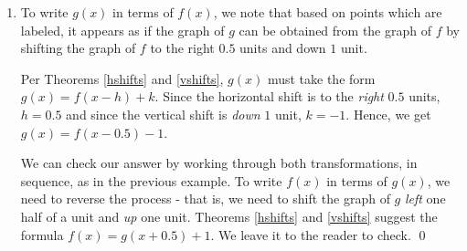 \begin{ex}
\begin{enumerate}
\begin{enumerate}
\[\begin{array}{ccc}
& 


\begin{mfpic}[15]{-4}{6}{-3}{5}
\axes
\tlabel[cc](6,-0.5){\scriptsize $x$}
\tlabel[cc](0.5,5){\scriptsize $y$}
\xmarks{-3,-2, -1, 0, 1, 2, 3, 4,5}
\ymarks{-2, -1, 0, 1, 2, 3,4}
\tcaption{\scriptsize $y = f(x+1)-2=F(x)$}
\tlpointsep{4pt}
\scriptsize
\tlabel[cc](-3.25, -2.5){$(-3,-2)$}
\tlabel[cc](-2, 1){$(1,1)$}
\tlabel[cc](1, 2.5){$(1,2)$}
\tlabel[cc](3, 0.5){$(3,2)$}
\axislabels {x}{{$1$} 1, {$2$} 2,  {$3$} 3,{$4$} 4, {$5$} 5, {\scriptsize $-1\hspace{7pt}$} -1}
\axislabels {y}{{$2$} 2,{$1$} 1,{$4$} 4,{$-1$} -1,{$-2$} -2, ,{$3$} 3}
\normalsize
\penwd{1.25pt}
\function{-3, 3, 0.1}{((x+3)*(5-x)/4)-2}
\point[4pt]{(-3,-2), (1,2), (-1,1)}
\pointfillfalse
\point[4pt]{(3,1)}
\end{mfpic}

\end{array}\]

To check, we start with the point $(-3, -2)$.  We find when we substitute $x=-3$ into the equation $y=f(x+1)-2$ we get $y = f(-3+1)-2 = f(-2)-2$.  Since $(-2,0)$ is on the graph of $f$, we know $f(-2) =0$, so  $y = f(-3+1)-2 = f(-2)-2 = 0 - 2 = -2$.  This proves $(-3,-2)$ is on the graph of $y=f(x+1)-2$.  We leave the checks of the remaining points to the reader.

\end{enumerate}

\item  To write $g(x)$ in terms of $f(x)$, we note that based on points which are labeled, it appears as if the graph of $g$ can be obtained from the graph of $f$ by shifting the graph of $f$ to the right $0.5$ units and down $1$ unit.  

\smallskip

Per Theorems \ref{hshifts} and \ref{vshifts}, $g(x)$ must take the form $g(x) = f(x-h)+k$.  Since the horizontal shift is to the \textit{right} $0.5$ units, $h = 0.5$ and since the vertical shift is \textit{down} $1$ unit, $k = -1$.   Hence, we get $g(x) = f(x-0.5)-1$.  

\smallskip

We can check our answer by working through both transformations, in sequence, as in the previous example.   To write $f(x)$ in terms of $g(x)$, we need to reverse the process - that is, we need to shift the graph of $g$ \textit{left} one half of a unit and \textit{up} one unit.   Theorems \ref{hshifts} and \ref{vshifts} suggest the formula $f(x) = g(x+0.5)+1$.  We leave it to the reader to check. \qed
  
 \end{enumerate}
 
 \end{ex}
 
